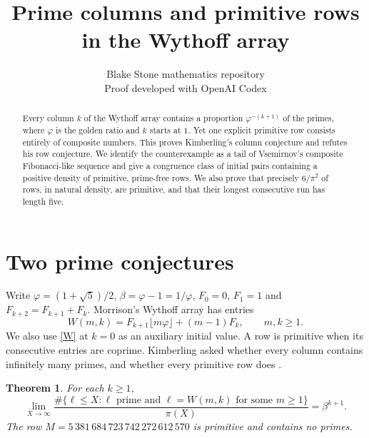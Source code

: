 \documentclass[11pt]{article}
\title{Prime columns and primitive rows\\in the Wythoff array}
\author{Blake Stone mathematics repository\\[-2pt]\small Proof developed with OpenAI Codex}
\date{}
\newtheorem{theorem}{Theorem}
\newcommand{\ph}{\varphi}
\newcommand{\fl}[1]{\lfloor #1\rfloor}
\begin{document}
\maketitle
\begin{abstract}
Every column $k$ of the Wythoff array contains a proportion
$\ph^{-(k+1)}$ of the primes, where $\ph$ is the golden ratio and $k$ starts at $1$.
Yet one explicit primitive row consists entirely of composite numbers.
This proves Kimberling's column conjecture and refutes his row conjecture.
We identify the counterexample as a tail of Vsemirnov's composite Fibonacci-like
sequence and give a congruence class of initial pairs containing a positive
density of primitive, prime-free rows. We also prove that precisely
$6/\pi^2$ of rows, in natural density, are primitive, and that their
longest consecutive run has length five.
\end{abstract}

\section{Two prime conjectures}
Write $\ph=(1+\sqrt5)/2$, $\beta=\ph-1=1/\ph$,
$F_0=0$, $F_1=1$ and $F_{k+2}=F_{k+1}+F_k$. Morrison's Wythoff array
\cite{morrison} has entries
\begin{equation}\label{W}
 W(m,k)=F_{k+1}\fl{m\ph}+(m-1)F_k,\qquad m,k\ge1 .
\end{equation}
We also use \eqref{W} at $k=0$ as an auxiliary initial value.
A row is primitive when its consecutive entries are coprime.
Kimberling asked whether every column contains infinitely many primes, and
whether every primitive row does \cite{primes}.

\begin{theorem}\label{primes}
For each $k\ge1$,
\[
 \lim_{X\to\infty}
 \frac{\#\{\ell\le X:\ell\text{ prime and }\ell=W(m,k)\text{ for some }m\ge1\}}{\pi(X)}
 =\beta^{k+1}.
\]
The row $M=5\,381\,684\,723\,742\,272\,612\,570$ is primitive and contains
no primes.
\end{theorem}
\end{document}
